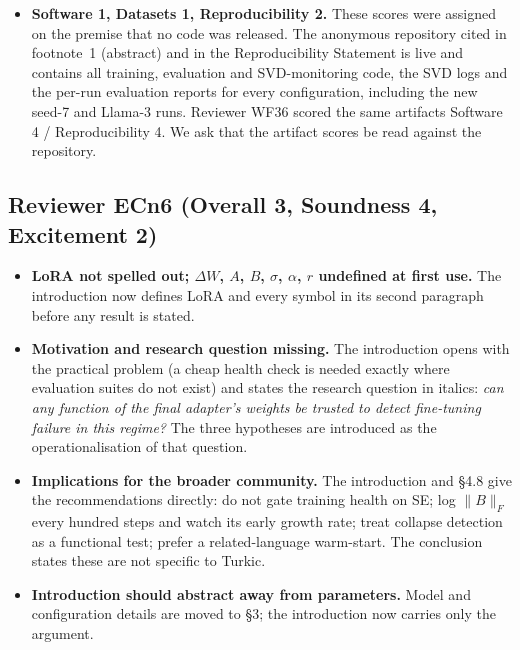 \documentclass[11pt]{article}
\begin{document}
\begin{itemize}
claim the paper makes is positive: the diagnostic signal lives in the
trajectory (\S4.8).
\item \textbf{Software 1, Datasets 1, Reproducibility 2.} These scores were
assigned on the premise that no code was released. The anonymous repository
cited in footnote~1 (abstract) and in the Reproducibility Statement is live
and contains all training, evaluation and SVD-monitoring code, the SVD logs
and the per-run evaluation reports for every configuration, including the
new seed-7 and Llama-3 runs. Reviewer WF36 scored the same artifacts
Software 4 / Reproducibility 4. We ask that the artifact scores be read
against the repository.
\end{itemize}

\subsection*{Reviewer ECn6 (Overall 3, Soundness 4, Excitement 2)}
\begin{itemize}
\item \textbf{LoRA not spelled out; $\Delta W$, $A$, $B$, $\sigma$, $\alpha$, $r$
undefined at first use.} The introduction now defines LoRA and every symbol
in its second paragraph before any result is stated.
\item \textbf{Motivation and research question missing.} The introduction opens
with the practical problem (a cheap health check is needed exactly where
evaluation suites do not exist) and states the research question in
italics: \emph{can any function of the final adapter's weights be trusted to
detect fine-tuning failure in this regime?} The three hypotheses are
introduced as the operationalisation of that question.
\item \textbf{Implications for the broader community.} The introduction and
\S4.8 give the recommendations directly: do not gate training health on SE;
log $\|B\|_F$ every hundred steps and watch its early growth rate; treat
collapse detection as a functional test; prefer a related-language
warm-start. The conclusion states these are not specific to Turkic.
\item \textbf{Introduction should abstract away from parameters.} Model and
configuration details are moved to \S3; the introduction now carries only
the argument.
\end{itemize}
\end{document}
